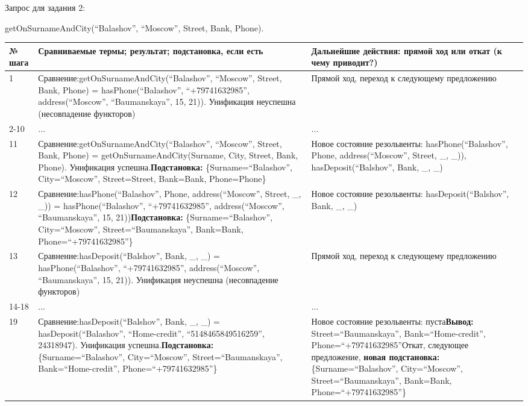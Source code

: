 \documentclass[14pt,a4paper]{scrreprt}
\begin{document}
Запрос для задания 2:

getOnSurnameAndCity(``Balashov'', ``Moscow'', Street, Bank, Phone).


\begin{table}[H]
	\begin{tabular}{|p{1.2cm\small}|p{9cm\small}|p{5cm\small}|}
		\hline
		№ шага & Сравниваемые термы; результат; подстановка, если есть & Дальнейшие действия: прямой ход или откат (к чему приводит?)\\
		\hline
		1 & Сравнение:\linebreak getOnSurnameAndCity(``Balashov'', ``Moscow'', Street, Bank, Phone) = hasPhone(``Balashov'', ``+79741632985'', address(``Moscow'', ``Baumanskaya'', 15, 21)). Унификация неуспешна (несовпадение функторов) & Прямой ход, переход к следующему предложению\\
		\hline
		2-10 & ... & ... \\
		\hline
		11 & Сравнение:\linebreak getOnSurnameAndCity(``Balashov'', ``Moscow'', Street, Bank, Phone) = getOnSurnameAndCity(Surname, City, Street, Bank, Phone). Унификация успешна.\linebreak \textbf{Подстановка:} \{Surname=``Balashov'', City=``Moscow'', Street=Street, Bank=Bank, Phone=Phone\} & Новое состояние резольвенты: hasPhone(``Balashov'', Phone, address(``Moscow'', Street, \_, \_)), hasDeposit(``Balshov'', Bank, \_, \_)\\
		\hline
		12 & Сравнение:\linebreak hasPhone(``Balashov'', Phone, address(``Moscow'', Street, \_, \_)) = hasPhone(``Balashov'', ``+79741632985'', address(``Moscow'', ``Baumanskaya'', 15, 21))\linebreak \textbf{Подстановка:} \{Surname=``Balashov'', City=``Moscow'', Street=``Baumanskaya'', Bank=Bank, Phone=``+79741632985''\} & Новое состояние резольвенты: hasDeposit(``Balshov'', Bank, \_, \_)\\
		\hline
		13 & Сравнение:\linebreak hasDeposit(``Balshov'', Bank, \_, \_) = hasPhone(``Balashov'', ``+79741632985'', address(``Moscow'', ``Baumanskaya'', 15, 21)). Унификация неуспешна (несовпадение функторов) & Прямой ход, переход к следующему предложению \\
		\hline
		14-18 & ... & ...\\
		\hline
		19 & Сравнение:\linebreak hasDeposit(``Balshov'', Bank, \_, \_) = hasDeposit(``Balashov'', ``Home-credit'', ``5148465849516259'', 24318947). Унификация успешна.\linebreak \textbf{Подстановка:} \{Surname=``Balashov'', City=``Moscow'', Street=``Baumanskaya'', Bank=``Home-credit'', Phone=``+79741632985''\} & Новое состояние резольвенты: пуста\linebreak \textbf{Вывод:} Street=``Baumanskaya'', Bank=``Home-credit'', Phone=``+79741632985''\linebreak Откат, следующее предложение, \textbf{новая подстановка:} \{Surname=``Balashov'', City=``Moscow'', Street=``Baumanskaya'', Bank=Bank, Phone=``+79741632985''\}\\

\end{tabular}
\end{table}
\end{document}
